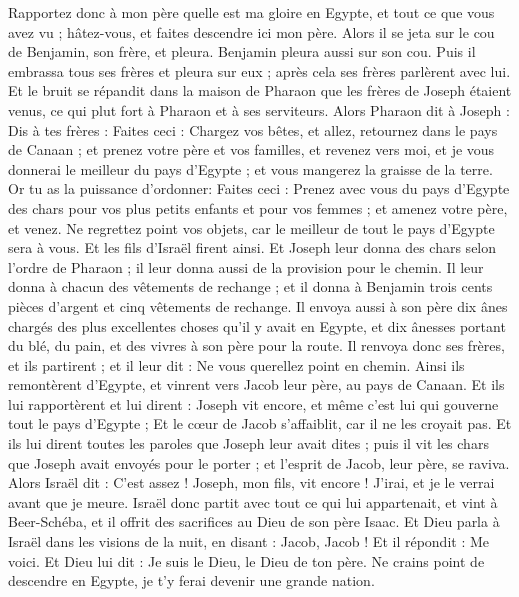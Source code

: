\begin{multicols}{2}
Rapportez donc à mon père quelle est ma gloire en Egypte, et tout ce que vous avez vu ; hâtez-vous, et faites descendre ici mon père.
Alors il se jeta sur le cou de Benjamin, son frère, et pleura. Benjamin pleura aussi sur son cou.
Puis il embrassa tous ses frères et pleura sur eux ; après cela ses frères parlèrent avec lui.
Et le bruit se répandit dans la maison de Pharaon que les frères de Joseph étaient venus, ce qui plut fort à Pharaon et à ses serviteurs.
Alors Pharaon dit à Joseph : Dis à tes frères : Faites ceci : Chargez vos bêtes, et allez, retournez dans le pays de Canaan ;
et prenez votre père et vos familles, et revenez vers moi, et je vous donnerai le meilleur du pays d'Egypte ; et vous mangerez la graisse de la terre.
Or tu as la puissance d'ordonner: Faites ceci : Prenez avec vous du pays d'Egypte des chars pour vos plus petits enfants et pour vos femmes ; et amenez votre père, et venez.
Ne regrettez point vos objets, car le meilleur de tout le pays d'Egypte sera à vous.
Et les fils d'Israël firent ainsi. Et Joseph leur donna des chars selon l'ordre de Pharaon ; il leur donna aussi de la provision pour le chemin.
Il leur donna à chacun des vêtements de rechange ; et il donna à Benjamin trois cents pièces d'argent et cinq vêtements de rechange.
Il envoya aussi à son père dix ânes chargés des plus excellentes choses qu'il y avait en Egypte, et dix ânesses portant du blé, du pain, et des vivres à son père pour la route.
Il renvoya donc ses frères, et ils partirent ; et il leur dit : Ne vous querellez point en chemin.
Ainsi ils remontèrent d'Egypte, et vinrent vers Jacob leur père, au pays de Canaan.
Et ils lui rapportèrent et lui dirent : Joseph vit encore, et même c'est lui qui gouverne tout le pays d'Egypte ; Et le cœur de Jacob s'affaiblit, car il ne les croyait pas.
Et ils lui dirent toutes les paroles que Joseph leur avait dites ; puis il vit les chars que Joseph avait envoyés pour le porter ; et l'esprit de Jacob, leur père, se raviva.
Alors Israël dit : C'est assez ! Joseph, mon fils, vit encore ! J'irai, et je le verrai avant que je meure.
\VerseOne{}Israël donc partit avec tout ce qui lui appartenait, et vint à Beer-Schéba, et il offrit des sacrifices au Dieu de son père Isaac.
Et Dieu parla à Israël dans les visions de la nuit, en disant : Jacob, Jacob ! Et il répondit : Me voici.
Et Dieu lui dit : Je suis le Dieu, le Dieu de ton père. Ne crains point de descendre en Egypte, je t'y ferai devenir une grande nation.

\end{multicols}
